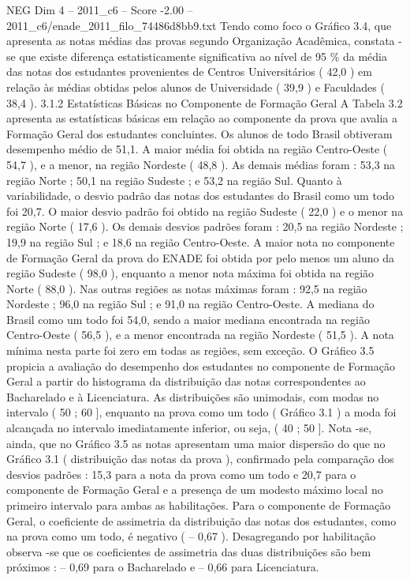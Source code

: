 \begin{textsample}{NEG Dim 4 – 2011\_c6 – Score -2.00 – 2011\_c6/enade\_2011\_filo\_74486d8bb9.txt}
Tendo como foco o Gráfico 3.4, que apresenta as notas médias das provas segundo Organização Acadêmica, constata -se que existe diferença estatisticamente significativa ao nível de 95 \% da média das notas dos estudantes provenientes de Centros Universitários ( 42,0 ) em relação às médias obtidas pelos alunos de Universidade ( 39,9 ) e Faculdades ( 38,4 ). 3.1.2 Estatísticas Básicas no Componente de Formação Geral A Tabela 3.2 apresenta as estatísticas básicas em relação ao componente da prova que avalia a Formação Geral dos estudantes concluintes.
Os alunos de todo Brasil obtiveram desempenho médio de 51,1.
A maior média foi obtida na região Centro-Oeste ( 54,7 ), e a menor, na região Nordeste ( 48,8 ).
As demais médias foram : 53,3 na região Norte ; 50,1 na região Sudeste ; e 53,2 na região Sul.
Quanto à variabilidade, o desvio padrão das notas dos estudantes do Brasil como um todo foi 20,7.
O maior desvio padrão foi obtido na região Sudeste ( 22,0 ) e o menor na região Norte ( 17,6 ).
Os demais desvios padrões foram : 20,5 na região Nordeste ; 19,9 na região Sul ; e 18,6 na região Centro-Oeste.
A maior nota no componente de Formação Geral da prova do ENADE foi obtida por pelo menos um aluno da região Sudeste ( 98,0 ), enquanto a menor nota máxima foi obtida na região Norte ( 88,0 ).
Nas outras regiões as notas máximas foram : 92,5 na região Nordeste ; 96,0 na região Sul ; e 91,0 na região Centro-Oeste.
A mediana do Brasil como um todo foi 54,0, sendo a maior mediana encontrada na região Centro-Oeste ( 56,5 ), e a menor encontrada na região Nordeste ( 51,5 ).
A nota mínima nesta parte foi zero em todas as regiões, sem exceção.
O Gráfico 3.5 propicia a avaliação do desempenho dos estudantes no componente de Formação Geral a partir do histograma da distribuição das notas correspondentes ao Bacharelado e à Licenciatura.
As distribuições são unimodais, com modas no intervalo ( 50 ; 60 ], enquanto na prova como um todo ( Gráfico 3.1 ) a moda foi alcançada no intervalo imediatamente inferior, ou seja, ( 40 ; 50 ].
Nota -se, ainda, que no Gráfico 3.5 as notas apresentam uma maior dispersão do que no Gráfico 3.1 ( distribuição das notas da prova ), confirmado pela comparação dos desvios padrões : 15,3 para a nota da prova como um todo e 20,7 para o componente de Formação Geral e a presença de um modesto máximo local no primeiro intervalo para ambas as habilitações.
Para o componente de Formação Geral, o coeficiente de assimetria da distribuição das notas dos estudantes, como na prova como um todo, é negativo ( – 0,67 ).
Desagregando por habilitação observa -se que os coeficientes de assimetria das duas distribuições são bem próximos : – 0,69 para o Bacharelado e – 0,66 para Licenciatura.

\end{textsample}
